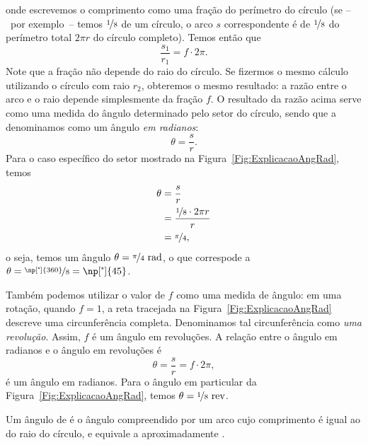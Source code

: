 \noindent{}onde escrevemos o comprimento como uma fração do perímetro do círculo (se --~por exemplo~-- temos $\nicefrac{1}{8}$ de um círculo, o arco $s$ correspondente é de $\nicefrac{1}{8}$ do perímetro total $2\pi r$ do círculo completo). Temos então que 
\begin{equation}
    \frac{s_1}{r_1} = f\cdot 2\pi.
\end{equation}
%
Note que a fração não depende do raio do círculo. Se fizermos o mesmo cálculo utilizando o círculo com raio $r_2$, obteremos o mesmo resultado: a razão entre o arco e o raio depende simplesmente da fração $f$. O resultado da razão acima serve como uma medida do ângulo determinado pelo setor do círculo, sendo que a denominamos como um ângulo \emph{em radianos}:
\begin{equation}
    \theta = \frac{s}{r}.
\end{equation}
%
Para o caso específico do setor mostrado na Figura~\ref{Fig:ExplicacaoAngRad}, temos
\begin{align}
    \theta &= \frac{s}{r} \\
    &= \frac{\nicefrac{1}{8} \cdot 2\pi r}{r} \\
    &= \nicefrac{\pi}{4},
\end{align}
%
o seja, temos um ângulo $\theta = \nicefrac{\pi}{4}~\rm{rad}$, o que correspode a $\theta = \nicefrac{\np[\tcdegree]{360}}{8} = \np[\tcdegree]{45}$.

Também podemos utilizar o valor de $f$ como uma medida de ângulo: em uma rotação, quando $f = 1$, a reta tracejada na Figura~\ref{Fig:ExplicacaoAngRad} descreve uma circunferência completa. Denominamos tal circunferência como \emph{uma revolução}. Assim, $f$ é um ângulo em revoluções. A relação entre o ângulo em radianos e o ângulo em revoluções é
\begin{equation}
    \theta = \frac{s}{r} = f \cdot 2 \pi,
\end{equation}
%
é um ângulo em radianos. Para o ângulo em particular da Figura~\ref{Fig:ExplicacaoAngRad}, temos $\theta = \nicefrac{1}{8}~\rm{rev}$.

\begin{marginfigure}
\centering
{}
\caption{Um ângulo de  é o ângulo compreendido por um arco cujo comprimento é igual ao do raio do círculo, e equivale a aproximadamente .}
\end{marginfigure}

